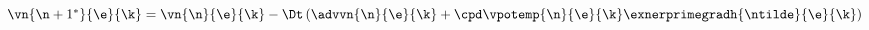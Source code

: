 $\vn{\n+1^*}{\e}{\k} = \vn{\n}{\e}{\k} - \Dt \left( \advvn{\n}{\e}{\k} + \cpd \vpotemp{\n}{\e}{\k} \exnerprimegradh{\ntilde}{\e}{\k} \right)$